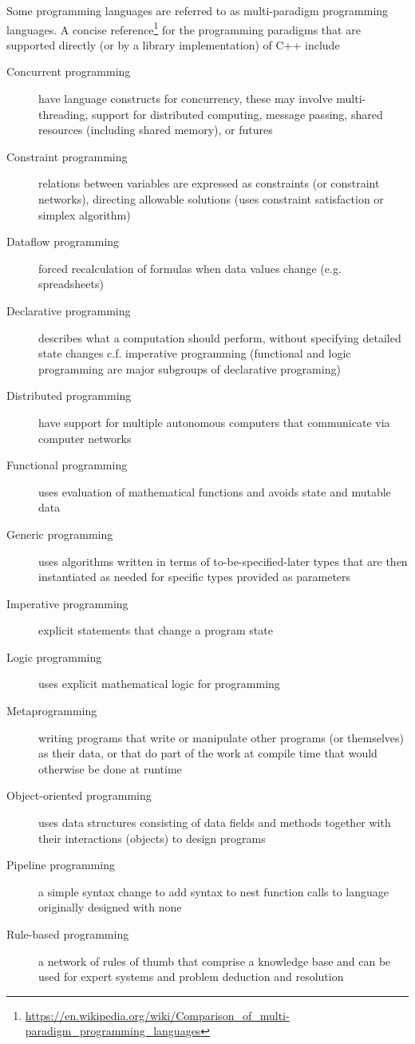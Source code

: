 Some programming languages are referred to as multi-paradigm programming languages. A concise reference\footnote{\url{https://en.wikipedia.org/wiki/Comparison_of_multi-paradigm_programming_languages}} for the programming
paradigms that are supported directly (or by a library implementation) of C++ include
\begin{description}
  \item[Concurrent programming] have language constructs for concurrency, these may involve multi-threading, support for distributed computing, message passing, shared resources (including shared memory), or futures
  \item[Constraint programming] relations between variables are expressed as constraints (or constraint networks), directing allowable solutions (uses constraint satisfaction or simplex algorithm)
  \item[Dataflow programming] forced recalculation of formulas when data values change (e.g. spreadsheets)
  \item[Declarative programming] describes what a computation should perform, without specifying detailed state changes c.f. imperative programming (functional and logic programming are major subgroups of declarative programing)
  \item[Distributed programming] have support for multiple autonomous computers that communicate via computer networks
  \item[Functional programming] uses evaluation of mathematical functions and avoids state and mutable data
  \item[Generic programming] uses algorithms written in terms of to-be-specified-later types that are then instantiated as needed for specific types provided as parameters
  \item[Imperative programming] explicit statements that change a program state
  \item[Logic programming] uses explicit mathematical logic for programming
  \item[Metaprogramming] writing programs that write or manipulate other programs (or themselves) as their data, or that do part of the work at compile time that would otherwise be done at runtime
  \item[Object-oriented programming] uses data structures consisting of data fields and methods together with their interactions (objects) to design programs
  \item[Pipeline programming] a simple syntax change to add syntax to nest function calls to language originally designed with none
  \item[Rule-based programming] a network of rules of thumb that comprise a knowledge base and can be used for expert systems and problem deduction and resolution
\end{description}

